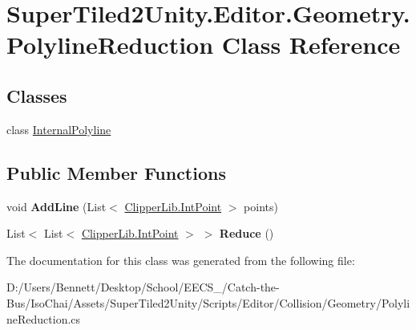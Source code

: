 \hypertarget{class_super_tiled2_unity_1_1_editor_1_1_geometry_1_1_polyline_reduction}{}\section{Super\+Tiled2\+Unity.\+Editor.\+Geometry.\+Polyline\+Reduction Class Reference}
\label{class_super_tiled2_unity_1_1_editor_1_1_geometry_1_1_polyline_reduction}
\subsection*{Classes}
\begin{DoxyCompactItemize}
\item 
class \mbox{\hyperlink{class_super_tiled2_unity_1_1_editor_1_1_geometry_1_1_polyline_reduction_1_1_internal_polyline}{Internal\+Polyline}}
\end{DoxyCompactItemize}
\subsection*{Public Member Functions}
\begin{DoxyCompactItemize}
\item 
\mbox{\label{class_super_tiled2_unity_1_1_editor_1_1_geometry_1_1_polyline_reduction_ad58d3ad33f30fb1aa44ec6c4255ca63e}} 
void {\bfseries Add\+Line} (List$<$ \mbox{\hyperlink{struct_super_tiled2_unity_1_1_editor_1_1_clipper_lib_1_1_int_point}{Clipper\+Lib.\+Int\+Point}} $>$ points)
\item 
\mbox{\label{class_super_tiled2_unity_1_1_editor_1_1_geometry_1_1_polyline_reduction_aa15133dc2b1ca8dbe9b6c29bc2afd284}} 
List$<$ List$<$ \mbox{\hyperlink{struct_super_tiled2_unity_1_1_editor_1_1_clipper_lib_1_1_int_point}{Clipper\+Lib.\+Int\+Point}} $>$ $>$ {\bfseries Reduce} ()
\end{DoxyCompactItemize}


The documentation for this class was generated from the following file\+:\begin{DoxyCompactItemize}
\item 
D\+:/\+Users/\+Bennett/\+Desktop/\+School/\+E\+E\+C\+S\+\_/\+Catch-\/the-\/\+Bus/\+Iso\+Chai/\+Assets/\+Super\+Tiled2\+Unity/\+Scripts/\+Editor/\+Collision/\+Geometry/Polyline\+Reduction.\+cs\end{DoxyCompactItemize}
